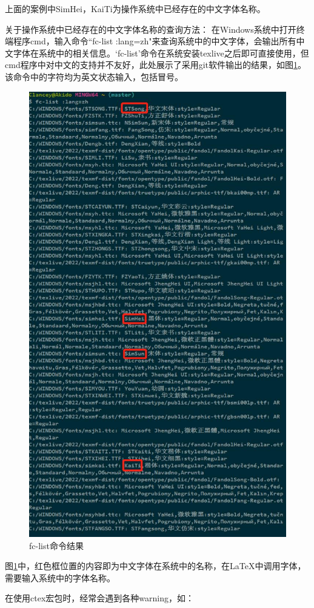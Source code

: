 \documentclass[12pt]{book}
\begin{document}
上面的案例中SimHei，KaiTi为操作系统中已经存在的中文字体名称。

关于操作系统中已经存在的中文字体名称的查询方法：
在Windows系统中打开终端程序cmd，输入命令``fc-list :lang=zh"来查询系统中的中文字体，会输出所有中文字体在系统中的相关信息。`fc-list'命令在系统安装texlive之后即可直接使用，但cmd程序中对中文的支持并不友好，此处展示了采用git软件输出的结果，如图\ref{fc-list}。该命令中的字符均为英文状态输入，包括冒号。

\begin{figure}[htbp]
	\centering
	\includegraphics[width=0.8\linewidth]{lang=zh.jpg}
	\caption{fc-list命令结果}
	\label{fc-list}
\end{figure}

图\ref{fc-list}中，红色框位置的内容即为中文字体在系统中的名称，在\LaTeX{}中调用字体，需要输入系统中的字体名称。

在使用ctex宏包时，经常会遇到各种warning，如：
\end{document}
